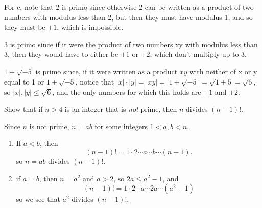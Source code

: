 \documentclass[11pt,dvipsnames]{book}
\numberwithin{figure}{section} %
\numberwithin{table}{section} %
\begin{document}
\begin{exercise}
\begin{solution}
For c, note that 2 is primo since otherwise 2 can be written as a product of two numbers with modulus less than 2, but then they must have modulus 1, and so they must be $\pm1$, which is impossible.

3 is primo since if it were the product of two numbers xy with modulus less than 3, then they would have to either be $\pm 1$ or $\pm 2$, which don't multiply up to 3.

$1+\sqrt{-5}$ is primo since, if it were written as a product $xy$ with neither of x or y equal to 1 or $1+\sqrt{-5}$, notice that $|x|\cdot |y|=|xy|=|1+\sqrt{-5}|=\sqrt{1+5}=\sqrt{6}$, so $|x|,|y|\leq \sqrt{6}$, and the only numbers for which this holds are $\pm 1$ and $\pm 2$.
\end{solution}

\end{exercise}

%
%
%

%
\begin{exercise} Show that if $n> 4$ is an integer that is {\it not} prime, then $n$ divides $(n-1)!$.

\begin{solution}

Since $n$ is not prime, $n=ab$ for some integers $1<a,b<n$.
\begin{enumerate}[label=(\alph*]
\item If $a<b$, then
\[
(n-1)!=1\cdot 2 \cdots a\cdots b\cdots (n-1).
\]
so $n=ab$ divides $(n-1)!$.
\item if $a=b$, then $n=a^2$ and $a>2$, so $2a\leq a^2-1$, and
\[
(n-1)!=1\cdot 2 \cdots a\cdots 2a\cdots (a^2-1)
\]
so we see that $a^2$ divides $(n-1)!$.
\end{enumerate}
\end{solution}
%
\end{exercise}
\end{document}
